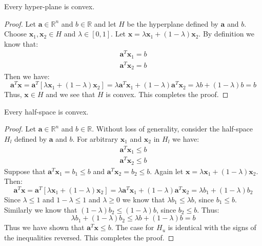 \begin{lemma} Every hyper-plane is convex.
\end{lemma}
\begin{proof} Let $\mathbf{a} \in \mathbb{R}^n$ and $b \in \mathbb{R}$ and let $H$ be the hyperplane defined by $\mathbf{a}$ and $b$. Choose $\mathbf{x}_1,\mathbf{x}_2 \in{H}$ and $\lambda \in [0,1]$. Let $\mathbf{x} = \lambda\mathbf{x}_1 + (1-\lambda)\mathbf{x}_2$.
By definition we know that:
\begin{gather*}
\mathbf{a}^T\mathbf{x}_1 = b\\
\mathbf{a}^T\mathbf{x}_2 = b
\end{gather*}
Then we have:
\begin{equation}
\mathbf{a}^T\mathbf{x} = \mathbf{a}^T\left[\lambda\mathbf{x}_1 + (1-\lambda)\mathbf{x}_2\right] = 
\lambda\mathbf{a}^T\mathbf{x}_1 + (1-\lambda)\mathbf{a}^T\mathbf{x}_2 = 
\lambda b + (1-\lambda)b = b
\end{equation}
Thus, $\mathbf{x} \in H$ and we see that $H$ is convex. This completes the proof.
\end{proof}
\begin{lemma} Every half-space is convex.
\label{lem:HalfSpaceConvex}
\end{lemma}
\begin{proof}
Let $\mathbf{a} \in \mathbb{R}^n$ and $b \in \mathbb{R}$. Without loss of generality, consider the half-space $H_l$ defined by $\mathbf{a}$ and $b$. For arbitrary $\mathbf{x}_1$ and $\mathbf{x}_2$ in $H_l$ we have:
\begin{gather*}
\mathbf{a}^T\mathbf{x}_1 \leq b\\
\mathbf{a}^T\mathbf{x}_2 \leq b
\end{gather*}
Suppose that $\mathbf{a}^T\mathbf{x}_1 = b_1 \leq b$ and $\mathbf{a}^T\mathbf{x}_2 = b_2 \leq b$. Again let $\mathbf{x} = \lambda\mathbf{x}_1 + (1-\lambda)\mathbf{x}_2$. Then:
\begin{equation}
\mathbf{a}^T\mathbf{x} = \mathbf{a}^T\left[\lambda\mathbf{x}_1 + (1-\lambda)\mathbf{x}_2\right] = 
\lambda\mathbf{a}^T\mathbf{x}_1 + (1-\lambda)\mathbf{a}^T\mathbf{x}_2 = 
\lambda b_1 + (1-\lambda)b_2
\end{equation}
Since $\lambda \leq 1$ and $1-\lambda \leq 1$ and $\lambda \geq 0$ we know that $\lambda b_1 \leq \lambda b$, since $b_1 \leq b$. Similarly we know that $(1-\lambda) b_2 \leq (1-\lambda)b$, since $b_2 \leq b$. Thus:
\begin{equation}
\lambda b_1 + (1-\lambda)b_2 \leq \lambda b + (1-\lambda)b=b
\end{equation}
Thus we have shown that $\mathbf{a}^T\mathbf{x} \leq b$. The case for $H_u$ is identical with the signs of the inequalities reversed. This completes the proof.
\end{proof}

